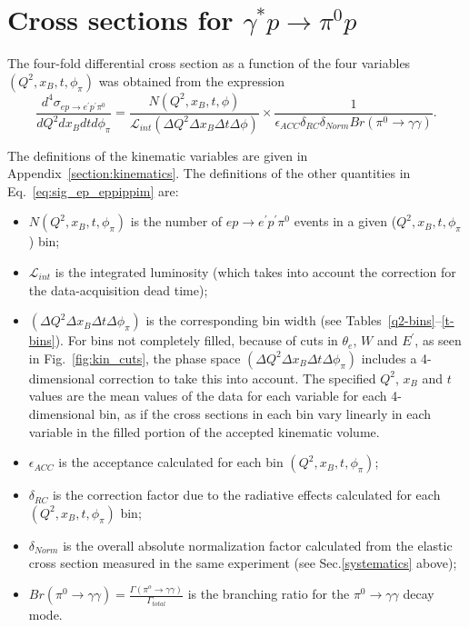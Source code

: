 \documentclass[prc,floatfix,twocolumn,superscriptaddress,letter]{revtex4}
\begin{document}
\section{Cross sections for $\gamma^*p\to \pi^0p$}
\label{section:cross_section}
\begin{widetext}
\noindent The four-fold differential cross section as a function of the four variables $(Q^2,x_B,t ,\phi_\pi)$ was obtained from the expression
\begin{equation}
\frac{d^4 \sigma_{ep \rightarrow e^\prime p^\prime \pi^0}}{dQ^2 dx_B dt d\phi_\pi} =
\frac{N(Q^2,x_B,t,\phi)}{\mathcal{L}_{int} (\Delta Q^2  \Delta x_B \Delta t \Delta \phi)} \times
\frac{1}{\epsilon_{ACC}\delta_{RC} \delta_{Norm}Br(\pi^0\to\gamma\gamma)}.
\label{eq:sig_ep_eppippim}
\end{equation}
\end{widetext}

\noindent The definitions of the kinematic variables  are given in  Appendix~\ref{section:kinematics}. The definitions of the other quantities in Eq.~\ref{eq:sig_ep_eppippim}  are:

\begin{itemize}

\item $N(Q^2,x_B,t,\phi_\pi)$ is the  number of $ep \rightarrow e^\prime p^\prime \pi^0$ events in a given ($Q^2,x_B,t,\phi_\pi$) bin;

\item $\mathcal{L}_{int}$ is the integrated luminosity (which takes
into account the correction for the data-acquisition dead time);

\item $(\Delta Q^2 \Delta x_B \Delta t \Delta \phi_\pi)$ is the corresponding bin width  (see Tables~\ref{q2-bins}--\ref{t-bins}).
For bins not completely filled, because of cuts in $\theta_e$, $W$  and $E^\prime$, as seen in Fig.~\ref{fig:kin_cuts},  the phase space $(\Delta Q^2 \Delta x_B\Delta t\Delta\phi_\pi)$ includes a 4-dimensional correction to take this into account. The specified $Q^2$, $x_B$ and $t$  values are the mean values of the data for each variable for each 4-dimensional bin, as if the cross sections in each bin vary linearly in each variable in the filled portion of the accepted kinematic volume.

\item $\epsilon_{ACC}$ is the acceptance calculated for each bin $(Q^2,x_B,t,\phi_\pi)$;

\item $\delta_{RC}$ is the correction factor due to the radiative effects calculated for each $(Q^2,x_B,t,\phi_\pi)$ bin;

\item $\delta_{Norm}$ is the overall absolute normalization factor calculated from the elastic cross section measured in the same experiment (see  Sec.\ref{systematics} above);
 
\item $Br(\pi^0\to\gamma\gamma)=\frac  {\Gamma(\pi^o\to\gamma\gamma) }   {\Gamma_{total}}$ is the branching ratio for the $\pi^0 \to \gamma\gamma$ decay mode.

\end{itemize}
\end{document}
